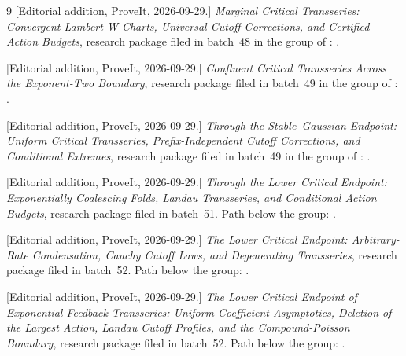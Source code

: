 \documentclass[11pt,a4paper]{article}
\numberwithin{equation}{section}
\theoremstyle{definition}
\theoremstyle{remark}
\begin{document}
\begin{thebibliography}{9}
[Editorial addition, ProveIt, 2026-09-29.]
\emph{Marginal Critical Transseries: Convergent Lambert-W Charts, Universal
Cutoff Corrections, and Certified Action Budgets}, research package filed
in batch~48 in the group of \cite{repo}:
.

[Editorial addition, ProveIt, 2026-09-29.]
\emph{Confluent Critical Transseries Across the Exponent-Two Boundary},
research package filed in batch~49 in the group of \cite{repo}:
.

[Editorial addition, ProveIt, 2026-09-29.]
\emph{Through the Stable--Gaussian Endpoint: Uniform Critical Transseries,
Prefix-Independent Cutoff Corrections, and Conditional Extremes}, research
package filed in batch~49 in the group of \cite{repo}:
.

[Editorial addition, ProveIt, 2026-09-29.]
\emph{Through the Lower Critical Endpoint: Exponentially Coalescing Folds,
Landau Transseries, and Conditional Action Budgets}, research package filed
in batch~51. Path below the group:
.

[Editorial addition, ProveIt, 2026-09-29.]
\emph{The Lower Critical Endpoint: Arbitrary-Rate Condensation, Cauchy
Cutoff Laws, and Degenerating Transseries}, research package filed in
batch~52. Path below the group:
.

[Editorial addition, ProveIt, 2026-09-29.]
\emph{The Lower Critical Endpoint of Exponential-Feedback Transseries:
Uniform Coefficient Asymptotics, Deletion of the Largest Action, Landau
Cutoff Profiles, and the Compound-Poisson Boundary}, research package filed
in batch~52. Path below the group:
.

\end{thebibliography}
\end{document}
